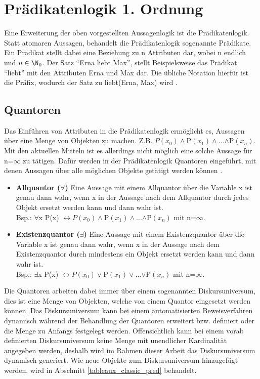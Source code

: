 \section{Prädikatenlogik 1. Ordnung}
Eine Erweiterung der oben vorgestellten Aussagenlogik ist die Prädikatenlogik. Statt atomaren Aussagen, behandelt die Prädikatenlogik sogenannte Prädikate. Ein Prädikat stellt dabei eine Beziehung zu n Attributen dar, wobei n endlich und $n\in\N_{0}$. Der Satz ``Erna liebt Max'', stellt Beispielsweise das Prädikat ``liebt'' mit den Attributen Erna und Max dar. Die übliche Notation hierfür ist die Präfix, wodurch der Satz zu liebt(Erna, Max) wird \cite{KB14}.

\subsection{Quantoren}
Das Einführen von Attributen in die Prädikatenlogik ermöglicht es, Aussagen über eine Menge von Objekten zu machen. Z.B. $P(x_{0})\wedge$P$(x_{1})\wedge$...$\wedge$P$(x_{n})$. Mit den aktuellen Mitteln ist es allerdings nicht möglich eine solche Aussage für n=$\infty$ zu tätigen. Dafür werden in der Prädikatenlogik Quantoren eingeführt, mit denen Aussagen über alle möglichen Objekte getätigt werden können \cite{KB14}.
\begin{itemize}
\item
\textbf{Allquantor ($\forall$)} Eine Aussage mit einem Allquantor über die Variable x ist genau dann wahr, wenn x in der Aussage nach dem Allquantor durch jedes Objekt ersetzt werden kann und dann wahr ist.\\
Bsp.: $\forall$x P(x) $\leftrightarrow P(x_{0})\wedge$P$(x_{1})\wedge$...$\wedge$P$(x_{n})$ mit n=$\infty$.

\item
\textbf{Existenzquantor ($\exists$)} Eine Aussage mit einem Existenzquantor über die Variable x ist genau dann wahr, wenn x in der Aussage nach dem Existenzquantor durch mindestens ein Objekt ersetzt werden kann und dann wahr ist.\\
Bsp.: $\exists$x P(x) $\leftrightarrow P(x_{0})\vee$P$(x_{1})\vee$...$\vee$P$(x_{n})$ mit n=$\infty$.
\end{itemize}

Die Quantoren arbeiten dabei immer über einem sogenannten Diskursuniversum, dies ist eine Menge von Objekten, welche von einem Quantor eingesetzt werden können. Das Diskursuniversum kann bei einem automatisierten Beweisverfahren dynamisch während der Behandlung der Quantoren erweitert bzw. definiert oder die Menge zu Anfangs festgelegt werden. Offensichtlich kann bei einem vorab definierten Diskursuniversum keine Menge mit unendlicher Kardinalität angegeben werden, deshalb wird im Rahmen dieser Arbeit das Diskursuniversum dynamisch generiert. Wie neue Objekte zum Diskursuniversum hinzugefügt werden, wird in Abschnitt \ref{tableaux_classic_pred} behandelt.

